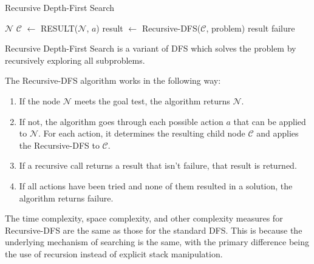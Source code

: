 \documentclass[a4paper,UKenglish,cleveref, autoref, thm-restate]{qlinhta}
\begin{document}
    \begin{algorithm}[H]
        \caption{Recursive Depth-First Search}\label{alg:recursive_dfs}
        \begin{algorithmic}[1]
                    \State \Return $\mathcal{N}$
                \Else
                        \State $\mathcal{C}$ $\gets$ RESULT($\mathcal{N}$, $a$)
                        \State result $\gets$ Recursive-DFS($\mathcal{C}$, problem)
                            \State \Return result
                        \EndIf
                    \EndFor
                \EndIf
                \State \Return failure
            \EndFunction
        \end{algorithmic}
    \end{algorithm}
    Recursive Depth-First Search is a variant of DFS which solves the problem by recursively exploring all subproblems.

    The Recursive-DFS algorithm works in the following way:
    \begin{enumerate}
        \item If the node $\mathcal{N}$ meets the goal test, the algorithm returns $\mathcal{N}$.
        \item If not, the algorithm goes through each possible action $a$ that can be applied to $\mathcal{N}$. For each action, it determines the resulting child node $\mathcal{C}$ and applies the Recursive-DFS to $\mathcal{C}$.
        \item If a recursive call returns a result that isn't failure, that result is returned.
        \item If all actions have been tried and none of them resulted in a solution, the algorithm returns failure.
    \end{enumerate}

    The time complexity, space complexity, and other complexity measures for Recursive-DFS are the same as those for the standard DFS. This is because the underlying mechanism of searching is the same, with the primary difference being the use of recursion instead of explicit stack manipulation.
\end{document}
